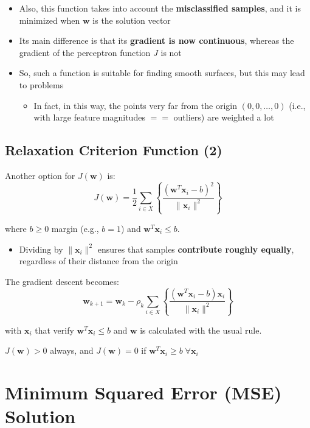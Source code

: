 \documentclass[11pt,a4paper]{article}
\theoremstyle{definition}
\theoremstyle{plain}
\theoremstyle{remark}
\begin{document}
\begin{itemize}
    \item Also, this function takes into account the \textbf{misclassified samples}, and it is minimized when $\mathbf{w}$ is the solution vector
    
    \item Its main difference is that its \textbf{gradient is now continuous}, whereas the gradient of the perceptron function $J$ is not
    
    \item So, such a function is suitable for finding smooth surfaces, but this may lead to problems
    \begin{itemize}
        \item In fact, in this way, the points very far from the origin $(0,0,\ldots,0)$ (i.e., with large feature magnitudes $==$ outliers) are weighted a lot
    \end{itemize}
\end{itemize}

\subsection{Relaxation Criterion Function (2)}

Another option for $J(\mathbf{w})$ is:
\[
J(\mathbf{w}) = \frac{1}{2} \sum_{i \in X} \left\{ \frac{(\mathbf{w}^T \mathbf{x}_i - b)^2}{\|\mathbf{x}_i\|^2} \right\}
\]

where $b \geq 0$ margin (e.g., $b = 1$) and $\mathbf{w}^T \mathbf{x}_i \leq b$.

\begin{itemize}
    \item Dividing by $\|\mathbf{x}_i\|^2$ ensures that samples \textbf{contribute roughly equally}, regardless of their distance from the origin
\end{itemize}

The gradient descent becomes:
\[
\mathbf{w}_{k+1} = \mathbf{w}_k - \rho_k \sum_{i \in X} \left\{ \frac{(\mathbf{w}^T \mathbf{x}_i - b)\mathbf{x}_i}{\|\mathbf{x}_i\|^2} \right\}
\]

with $\mathbf{x}_i$ that verify $\mathbf{w}^T \mathbf{x}_i \leq b$ and $\mathbf{w}$ is calculated with the usual rule.

$J(\mathbf{w}) > 0$ always, and $J(\mathbf{w}) = 0$ if $\mathbf{w}^T \mathbf{x}_i \geq b \; \forall \mathbf{x}_i$

\section{Minimum Squared Error (MSE) Solution}
\end{document}
